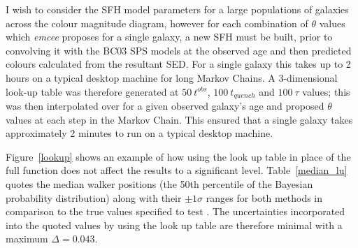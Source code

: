 \begin{table}
\label{median_lu}
\end{table}

I wish to consider the SFH model parameters for a large populations of galaxies across the colour magnitude diagram, however for each combination of $\theta$ values which \emph{emcee} proposes for a single galaxy, a new SFH must be built, prior to convolving it with the BC03 SPS models at the observed age and then predicted colours calculated from the resultant SED. For a single galaxy this takes up to 2 hours on a typical desktop machine for long Markov Chains. A 3-dimensional look-up table was therefore generated at $50 ~t^{obs}$, $100 ~t_{quench}$ and $100 ~\tau$ values; this was then interpolated over for a given observed galaxy's age and proposed $\theta$ values at each step in the Markov Chain. This ensured that a single galaxy takes approximately 2 minutes to run on a typical desktop machine. 

Figure~\ref{lookup} shows an example of how using the look up table in place of the full function does not affect the results to a significant level. Table~\ref{median_lu} quotes the median walker positions (the 50th percentile of the Bayesian probability distribution) along with their $\pm 1\sigma$ ranges for both methods in comparison to the true values specified to test \starpy. The uncertainties incorporated into the quoted values by using the look up table are therefore minimal with a maximum $\Delta = 0.043$.

